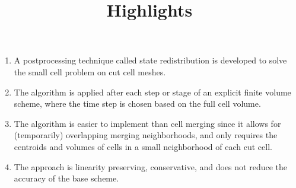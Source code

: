 \documentclass{article}
\title{Highlights}
\date{}
\begin{document}
\maketitle

\begin{enumerate}
\item
A postprocessing technique called state redistribution is developed to solve the small cell problem on cut cell meshes.

\item
The algorithm is applied after each step or stage of an explicit finite volume scheme, where the time step is chosen based on the full cell volume.

\item 
The algorithm is easier to implement than cell merging since it allows
for (temporarily) overlapping merging neighborhoods, and only requires
the centroids and volumes of cells in a small neighborhood of each cut cell.

\item 
The approach is linearity preserving, conservative, and does not reduce the accuracy of the base scheme.
\end{enumerate}
\end{document}
